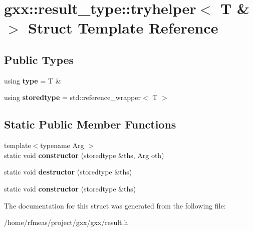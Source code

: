 \hypertarget{structgxx_1_1result__type_1_1tryhelper_3_01T_01_6_01_4}{}\section{gxx\+:\+:result\+\_\+type\+:\+:tryhelper$<$ T \& $>$ Struct Template Reference}
\label{structgxx_1_1result__type_1_1tryhelper_3_01T_01_6_01_4}
\subsection*{Public Types}
\begin{DoxyCompactItemize}
\item 
using {\bfseries type} = T \&\hypertarget{structgxx_1_1result__type_1_1tryhelper_3_01T_01_6_01_4_a1866d52bfd8b01274ba4d1e79bd7b204}{}\label{structgxx_1_1result__type_1_1tryhelper_3_01T_01_6_01_4_a1866d52bfd8b01274ba4d1e79bd7b204}

\item 
using {\bfseries storedtype} = std\+::reference\+\_\+wrapper$<$ T $>$\hypertarget{structgxx_1_1result__type_1_1tryhelper_3_01T_01_6_01_4_a5ee33235a5b8ab9d9d1d203aafcb5585}{}\label{structgxx_1_1result__type_1_1tryhelper_3_01T_01_6_01_4_a5ee33235a5b8ab9d9d1d203aafcb5585}

\end{DoxyCompactItemize}
\subsection*{Static Public Member Functions}
\begin{DoxyCompactItemize}
\item 
{\footnotesize template$<$typename Arg $>$ }\\static void {\bfseries constructor} (storedtype \&ths, Arg oth)\hypertarget{structgxx_1_1result__type_1_1tryhelper_3_01T_01_6_01_4_af66d447787808a6a5f54e4ee061d9f4f}{}\label{structgxx_1_1result__type_1_1tryhelper_3_01T_01_6_01_4_af66d447787808a6a5f54e4ee061d9f4f}

\item 
static void {\bfseries destructor} (storedtype \&ths)\hypertarget{structgxx_1_1result__type_1_1tryhelper_3_01T_01_6_01_4_a232bae47b663b3c60bd3b9c2e3bea64d}{}\label{structgxx_1_1result__type_1_1tryhelper_3_01T_01_6_01_4_a232bae47b663b3c60bd3b9c2e3bea64d}

\item 
static void {\bfseries constructor} (storedtype \&ths)\hypertarget{structgxx_1_1result__type_1_1tryhelper_3_01T_01_6_01_4_a3c28c99f5f2ac7017c1b7320dcde8be4}{}\label{structgxx_1_1result__type_1_1tryhelper_3_01T_01_6_01_4_a3c28c99f5f2ac7017c1b7320dcde8be4}

\end{DoxyCompactItemize}


The documentation for this struct was generated from the following file\+:\begin{DoxyCompactItemize}
\item 
/home/rfmeas/project/gxx/gxx/result.\+h\end{DoxyCompactItemize}

